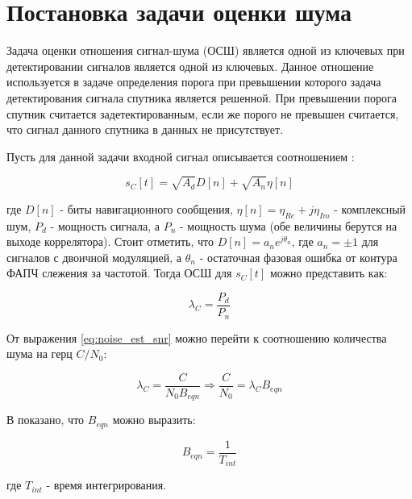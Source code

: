 \section{Постановка задачи оценки шума}

Задача оценки отношения сигнал-шума (ОСШ) является одной из ключевых при детектировании сигналов
является одной из ключевых. Данное отношение используется в задаче определения порога при превышении
которого задача детектирования сигнала спутника является решенной. При превышении порога спутник
считается задетектированным, если же порого не превышен считается, что сигнал данного спутника
в данных не присутствует.

Пусть для данной задачи входной сигнал описывается соотношением \cite{presti_ieee}:
\begin{center}
\begin{equation}
	\label{eq:noise_est_signal}
	s_C[t]=\sqrt{A_d}D[n] + \sqrt{A_n}\eta[n]
\end{equation}
\end{center}
где $D[n]$ - биты навигационного сообщения, $\eta[n]=\eta_{Re} + j\eta_{Im}$ - комплексный шум,
$P_d$ - мощность сигнала, а $P_n$ - мощность шума (обе величины берутся на выходе коррелятора).
Стоит отметить, что $D[n]=a_{n}e^{j\theta_n}$, где $a_n=\pm{1}$ для сигналов с двоичной модуляцией, а
$\theta_n$ - остаточная фазовая ошибка от контура ФАПЧ слежения за частотой.
Тогда ОСШ для $s_C[t]$ можно представить как:
\begin{center}
\begin{equation}
	\label{eq:noise_est_snr}
	\lambda_C=\frac{P_d}{P_n}
\end{equation}
\end{center}
От выражения \ref{eq:noise_est_snr} можно перейти к соотношению количества шума на герц $C/N_0$:
\begin{center}
\begin{equation}
	\label{eq:noise_est_cn}
	\lambda_C=\frac{C}{N_{0}B_{eqn}}\Rightarrow\frac{C}{N_0}=\lambda_{C}B_{eqn}
\end{equation}
\end{center}
В \cite{presti_ieee} показано, что $B_{eqn}$ можно выразить:
\begin{center}
\begin{equation}
	\label{eq:noise_est_beqn}
	B_{eqn}=\frac{1}{T_{int}}
\end{equation}
\end{center}
где ${T_{int}}$ - время интегрирования.


\newpage
